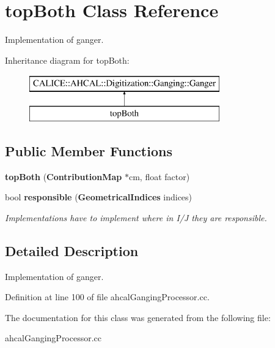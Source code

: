 \section{top\-Both Class Reference}
\label{classtopBoth}


Implementation of ganger.  


Inheritance diagram for top\-Both\-:\begin{figure}[H]
\begin{center}
\leavevmode
\includegraphics[height=2.000000cm]{classtopBoth}
\end{center}
\end{figure}
\subsection*{Public Member Functions}
\begin{DoxyCompactItemize}
\item 
{\bfseries top\-Both} ({\bf Contribution\-Map} $\ast$cm, float factor)\label{classtopBoth_a25f74b3d955a26ade7d58df706ed3a8a}

\item 
bool {\bf responsible} ({\bf Geometrical\-Indices} indices)\label{classtopBoth_a4772fca3483764c3b5469f020f1c9f26}

\begin{DoxyCompactList}\small\item\em Implementations have to implement where in I/\-J they are responsible. \end{DoxyCompactList}\end{DoxyCompactItemize}


\subsection{Detailed Description}
Implementation of ganger. 

Definition at line 100 of file ahcal\-Ganging\-Processor.\-cc.



The documentation for this class was generated from the following file\-:\begin{DoxyCompactItemize}
\item 
ahcal\-Ganging\-Processor.\-cc\end{DoxyCompactItemize}
